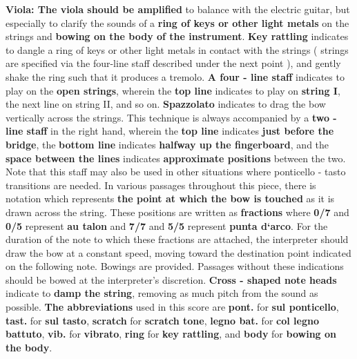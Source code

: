 \documentclass[12pt]{article}
\newcommand*\circled[1]{\tikz[baseline=(char.base)]{
            \node[shape=circle,draw,inner sep=1pt] (char) {#1};}}
\begin{document}
\begingroup
\textbf{Viola: \circled{1} The viola should be amplified} to balance with the electric guitar, but especially to clarify the sounds of a \textbf{ring of keys or other light metals} on the strings and \textbf{bowing on the body of the instrument}. \textbf{\circled{2} Key rattling} indicates to dangle a ring of keys or other light metals in contact with the strings ( strings are specified via the four-line staff described under the next point ), and gently shake the ring such that it produces a tremolo. \textbf{\circled{3} A four - line staff} indicates to play on the \textbf{open strings}, wherein the \textbf{top line} indicates to play on \textbf{string I}, the next line on string II, and so on. \textbf{\circled{4} Spazzolato} indicates to drag the bow vertically across the strings. This technique is always accompanied by a \textbf{two - line staff} in the right hand, wherein the \textbf{top line} indicates \textbf{just before the bridge}, the \textbf{bottom line} indicates \textbf{halfway up the fingerboard}, and the \textbf{space between the lines} indicates \textbf{approximate positions} between the two. Note that this staff may also be used in other situations where ponticello - tasto transitions are needed. \textbf{\circled{5}} In various passages throughout this piece, there is notation which represents \textbf{the point at which the bow is touched} as it is drawn across the string. These positions are written as \textbf{fractions} where \textbf{0/7} and \textbf{0/5} represent \textbf{au talon} and \textbf{7/7} and \textbf{5/5} represent \textbf{punta d`arco}. For the duration of the note to which these fractions are attached, the interpreter should draw the bow at a constant speed, moving toward the destination point indicated on the following note. Bowings are provided. Passages without these indications should be bowed at the interpreter’s discretion. \textbf{\circled{6} Cross - shaped note heads} indicate to \textbf{damp the string}, removing as much pitch from the sound as possible. \textbf{\circled{7} The abbreviations} used in this score are \textbf{pont.} for \textbf{sul ponticello}, \textbf{tast.} for \textbf{sul tasto}, \textbf{scratch} for \textbf{scratch tone}, \textbf{legno bat.} for \textbf{col legno battuto}, \textbf{vib.} for \textbf{vibrato}, \textbf{ring} for \textbf{key rattling}, and \textbf{body} for \textbf{bowing on the body}.
\endgroup

\pagebreak
\end{document}
